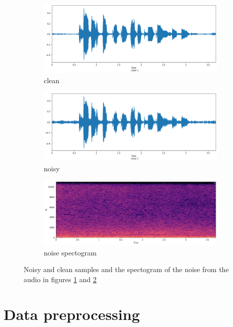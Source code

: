 \documentclass{article}
\begin{document}
	\begin{figure}[H]
		\centering
		\begin{subfigure}{.5\textwidth}
			\centering
			\includegraphics[width=.8\linewidth]{wave_for_noise_clean}
			\caption{clean}
			\label{fig:wave_for_noise_clean}
		\end{subfigure}%
		\begin{subfigure}{.5\textwidth}
			\centering
			\includegraphics[width=.8\linewidth]{wave_for_noise_noisy}
			\caption{noisy}
			\label{fig:wave_for_noise_noisy}
		\end{subfigure}
		\label{fig:clean_noisy_n}
		
		\begin{subfigure}{.7\textwidth}
			\centering
			\includegraphics[width=.8\linewidth]{noise}
			\caption{noise spectogram}
			\label{fig:noise}
		\end{subfigure}
		\caption{Noisy and clean samples and the spectogram of the noise from the audio in figures \ref{fig:wave_for_noise_clean} and \ref{fig:wave_for_noise_noisy}}
		\label{fig:clean_noisy_noise}
	\end{figure}

	

	\section{Data preprocessing}
\end{document}
